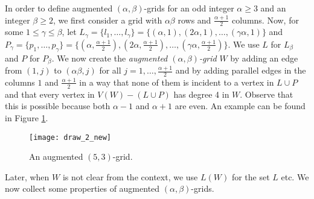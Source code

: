 \documentclass[a4paper,12pt,makeidx]{article}
\begin{document}
In order to define augmented $(\alpha,\beta)$-grids for an odd integer  $\alpha \geq 3$  and an integer $\beta \geq 2$, we first consider a grid with $\alpha \beta$ rows and $\frac{\alpha +1}{2}$ columns. Now, for some $1 \leq \gamma \leq \beta$, let $L_{\gamma}=\{ l_1,\ldots,l_{\gamma}\}=\{(\alpha,1),(2 \alpha,1),\ldots,(\gamma \alpha, 1)\}$ and $P_{\gamma}=\{p_1,\ldots,p_{\gamma}\}=\{(\alpha,\frac{\alpha +1}{2}),(2 \alpha,\frac{\alpha +1}{2}),\ldots,(\gamma \alpha, \frac{\alpha +1}{2})\}$.
 We use $L$ for $L_{\beta}$ and $P$ for $P_{\beta}$. We now create the {\it augmented  $(\alpha,\beta)$-grid} $W$ by adding an edge from $(1,j)$ to $(\alpha \beta,j)$ for all $j=1,\ldots, \frac{\alpha +1}{2}$ and by adding parallel edges in the columns $1$ and $\frac{\alpha +1}{2}$ in a way that none of them is incident to a vertex in $L \cup P$ and that every vertex in $V(W)-(L\cup P)$ has degree 4 in $W$. Observe that this is possible because both $\alpha-1$ and $\alpha +1$ are even. An example can be found in Figure \ref{draw2}.

 \begin{figure}[h]
        \centerline{\texttt{[image: draw\_2\_new]}}
        \caption{An augmented $(5,3)$-grid.}\label{draw2}
    \end{figure}

 Later, when $W$ is not clear from the context, we use $L(W)$ for the set $L$ etc. We now collect some properties of augmented $(\alpha,\beta)$-grids.
\end{document}
